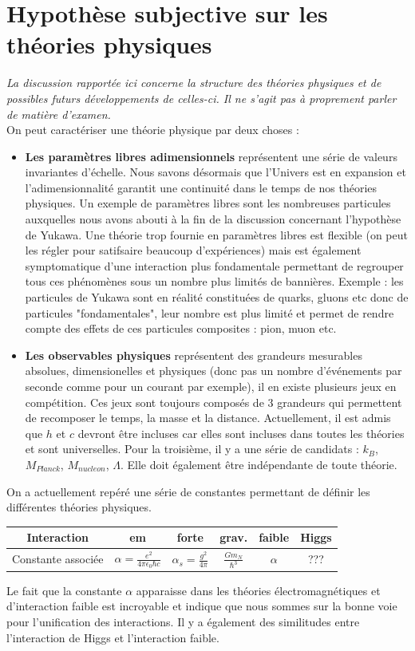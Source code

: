 \section{Hypothèse subjective sur les théories physiques}
\emph{La discussion rapportée ici concerne la structure des théories physiques et de possibles futurs développements de celles-ci. Il ne s'agit pas à proprement parler de matière d'examen.}\\
On peut caractériser une théorie physique par deux choses :
\begin{itemize}[label = $\bullet$]
    \item \textbf{Les paramètres libres adimensionnels} représentent une série de valeurs invariantes d'échelle. Nous savons désormais que l'Univers est en expansion et l'adimensionnalité garantit une continuité dans le temps de nos théories physiques. Un exemple de paramètres libres sont les nombreuses particules auxquelles nous avons abouti à la fin de la discussion concernant l'hypothèse de Yukawa. Une théorie trop fournie en paramètres libres est flexible (on peut les régler pour satifsaire beaucoup d'expériences) mais est également symptomatique d'une interaction plus fondamentale permettant de regrouper tous ces phénomènes sous un nombre plus limités de bannières. Exemple : les particules de Yukawa sont en réalité constituées de quarks, gluons etc donc de particules "fondamentales", leur nombre est plus limité et permet de rendre compte des effets de ces particules composites : pion, muon etc.
    \item \textbf{Les observables physiques} représentent des grandeurs mesurables absolues, dimensionelles et physiques (donc pas un nombre d'événements par seconde comme pour un courant par exemple), il en existe plusieurs jeux en compétition. Ces jeux sont toujours composés de 3 grandeurs qui permettent de recomposer le temps, la masse et la distance. Actuellement, il est admis que $h$ et $c$ devront être incluses car elles sont incluses dans toutes les théories et sont universelles. Pour la troisième, il y a une série de candidats : $k_B$, $M_{Planck}$, $M_{nucleon}$, $\Lambda$. Elle doit également être indépendante de toute théorie.
\end{itemize}
On a actuellement repéré une série de constantes permettant de définir les différentes théories physiques.
\begin{table}[H]
    \centering
    \begin{tabular}{|c|c|c|c|c|c|}
    \hline
         Interaction &em&forte&grav.&faible & Higgs  \\
         \hline
         Constante associée& $\alpha=\frac{e^2}{4\pi\epsilon_0\hbar c}$&$\alpha_s=\frac{g^2}{4\pi}$&$\frac{Gm_N}{\hbar^3}$&$\alpha$&???\\
         \hline
    \end{tabular}
\end{table}
Le fait que la constante $\alpha$ apparaisse dans les théories électromagnétiques et d'interaction faible est incroyable et indique que nous sommes sur la bonne voie pour l'unification des interactions. Il y a également des similitudes entre l'interaction de Higgs et l'interaction faible.





